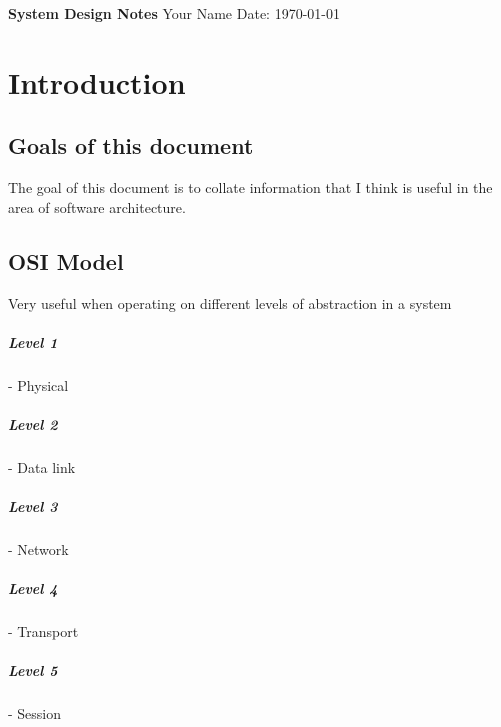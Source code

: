 \documentclass[a4paper, 11pt]{book}
\begin{document}
    \begin{titlepage}
        \centering
        \vspace*{2in}
        \Huge \textbf{System Design Notes}
        \vfill
        \Large Your Name
        \vfill
        \Large Date: \today
    \end{titlepage}

    \newpage

    \tableofcontents
    \newpage


    \chapter{Introduction}

    \section{Goals of this document}
    The goal of this document is to collate information that I think is useful in the area of software architecture.

    \section{OSI Model}
    Very useful when operating on different levels of abstraction in a system

    \paragraph{Level 1} - Physical

    \paragraph{Level 2} - Data link

    \paragraph{Level 3} - Network

    \paragraph{Level 4} - Transport

    \paragraph{Level 5} - Session
\end{document}
